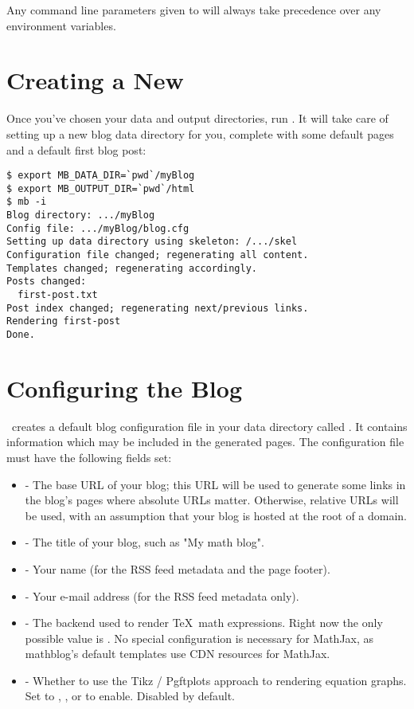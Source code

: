 \documentclass[11pt, letterpaper, oneside, titlepage]{book}
\begin{document}
Any command line parameters given to  will always take
precedence over any environment variables.

\section{Creating a New \mathblog}

Once you've chosen your data and output directories, run .
It will take care of setting up a new blog data directory for you,
complete with some default pages and a default first blog post:

\begin{verbatim}
$ export MB_DATA_DIR=`pwd`/myBlog
$ export MB_OUTPUT_DIR=`pwd`/html
$ mb -i
Blog directory: .../myBlog
Config file: .../myBlog/blog.cfg
Setting up data directory using skeleton: /.../skel
Configuration file changed; regenerating all content.
Templates changed; regenerating accordingly.
Posts changed:
  first-post.txt
Post index changed; regenerating next/previous links.
Rendering first-post
Done.
\end{verbatim}

\section{Configuring the Blog}

\mathblog\ creates a default blog configuration file in your data
directory called .  It contains information which may be
included in the generated pages.  The configuration file 
must have the following fields set:

\begin{itemize}
\item{ - The base URL of your blog; this URL will be used
  to generate some links in the blog's pages where absolute URLs
  matter.  Otherwise, relative URLs will be used, with an assumption
  that your blog is hosted at the root of a domain.}
\item{ - The title of your blog, such as "My math blog".}
\item{ - Your name (for the RSS feed metadata and the
  page footer).}
\item{ - Your e-mail address (for the RSS feed
  metadata only).}
\item{ - The backend used to render \TeX\ math
  expressions.  Right now the only possible value is .  No
  special configuration is necessary for MathJax, as mathblog's
  default templates use CDN resources for MathJax.}
\item{ - Whether to use the Tikz / Pgftplots approach to
  rendering equation graphs.  Set to , , or  to
  enable.  Disabled by default.}
\end{itemize}
\end{document}
